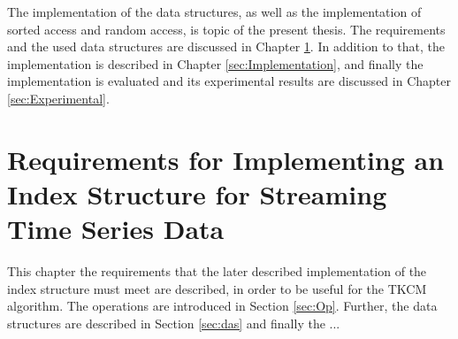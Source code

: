 \documentclass[abstracton,12pt]{scrreprt}
\begin{document}
The implementation of the data structures, as well as the implementation of sorted access and random access, is topic of the present thesis. The requirements and the used data structures are discussed in Chapter \ref{sec:P}. In addition to that, the implementation is described in Chapter \ref{sec:Implementation}, and finally the implementation is evaluated and its experimental results are discussed in Chapter \ref{sec:Experimental}.  


\chapter{Requirements for Implementing an Index Structure for Streaming Time Series Data}
\label{sec:P}
This chapter the requirements that the later described implementation of the index structure must meet are described, in order to be useful for the TKCM algorithm. The operations are introduced in Section \ref{sec:Op}. Further, the data structures are described in Section \ref{sec:das} and finally the ...
\end{document}
